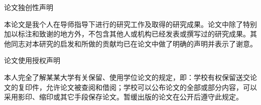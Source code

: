 \documentclass[a4paper,zihao=-4]{ctexart}
\begin{document}

\clearpage

\thispagestyle{empty}

\vspace*{0.2\baselineskip}

\begin{center}
    {\heiti\fontsize{20bp}{28bp}\selectfont 论文独创性声明}
\end{center}

\vspace*{\baselineskip}

本论文是我个人在导师指导下进行的研究工作及取得的研究成果。论文中除了特别加以标注和致谢的地方外，不包含其他人或机构已经发表或撰写过的研究成果。其他同志对本研究的启发和所做的贡献均已在论文中做了明确的声明并表示了谢意。

\vspace*{2.4\baselineskip}

\hspace*{1.5cm}  \hrulefill \hspace*{4em} \hrulefill \hspace*{0.5cm}

\vspace*{4.0\baselineskip}

\begin{center}
    {\heiti\fontsize{20bp}{28bp}\selectfont 论文使用授权声明}
\end{center}

\vspace*{\baselineskip}

本人完全了解某某大学有关保留、使用学位论文的规定，即：学校有权保留送交论文的复印件，允许论文被查阅和借阅；学校可以公布论文的全部或部分内容，可以采用影印、缩印或其它手段保存论文。暂缓出版的论文在公开后遵守此规定。

\vspace*{2.4\baselineskip}

\hspace*{1.5cm}  \hrulefill \hspace*{4em}  \hrulefill \hspace*{0.5cm}

\vspace*{0.25\baselineskip}

\hspace*{1.5cm}  \hrulefill \hspace*{4em}  \hrulefill \hspace*{0.5cm}

\vspace*{2.0\baselineskip}
\end{document}
